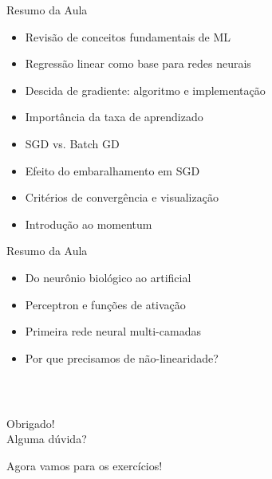 \documentclass[xcolor=dvipsnames,t,aspectratio=169]{beamer} %
\newcommand{\highlight}[1]{{\color{nes_dark_orange} #1}}
\begin{document}
\begin{frame}[c]{Resumo da Aula}
    
    \begin{display}
        \begin{itemize}
            \item Revisão de conceitos fundamentais de ML
            \item Regressão linear como base para redes neurais
            \item \highlight{Descida de gradiente}: algoritmo e implementação
            \item Importância da \highlight{taxa de aprendizado}
            \item \highlight{SGD vs. Batch GD}
            \item Efeito do \highlight{embaralhamento} em SGD
            \item Critérios de convergência e visualização
            \item Introdução ao \highlight{momentum}
        \end{itemize}
    \end{display}

\end{frame}   
\begin{frame}[c]{Resumo da Aula}
    \begin{display}
        \begin{itemize}
            \item Do neurônio biológico ao artificial
            \item \highlight{Perceptron} e funções de ativação
            \item Primeira rede neural \highlight{multi-camadas}
            \item Por que precisamos de \highlight{não-linearidade}?
        \end{itemize}
    \end{display}
\end{frame}

\begin{frame}
    \frametitle{~}
        \vfill
        \begin{center}
            {\Huge Obrigado!}\vspace{1.5em}\\
            {\Large \highlight{Alguma dúvida?}}\\
        \end{center}
        \vfill
        \begin{center}
            {\small Agora vamos para os exercícios!}
        \end{center}
\end{frame}
\end{document}
